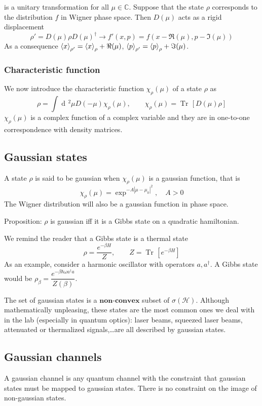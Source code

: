 \documentclass[a4paper, 11pt]{article}
\newcommand{\dd}{\mathop{\mathrm{d}\!}{}}
\newcommand{\Tr}{\mathop{\mathrm{Tr}\!}{}}
\newcommand{\HH}{\mathcal{H}}
\begin{document}
	is a unitary transformation for all $\mu \in \mathbb{C}$. Suppose that the state $\rho$ corresponds to the distribution $f$ in Wigner phase space. Then $D(\mu)$ acts as a rigid displacement
	\[ \rho' = D(\mu) \rho D(\mu)^\dagger \rightarrow f'(x,p) = f(x-\Re(\mu), p-\Im(\mu)) \]
	As a consequence $\braket{x}_{\rho'} = \braket{x}_\rho + \Re(\mu)$, $\braket{p}_{\rho'} = \braket{p}_\rho + \Im(\mu)$.
	
	\subsubsection{Characteristic function} We now introduce the characteristic function $\chi_\rho(\mu)$ of a state $\rho$ as
	\[ \rho = \int \dd^2\mu D(-\mu) \chi_\rho(\mu),\qquad \chi_\rho(\mu) = \Tr\left[D(\mu)\rho\right] \]
	$\chi_\rho(\mu)$ is a complex function of a complex variable and they are in one-to-one correspondence with density matrices.
	
	\subsection{Gaussian states} A state $\rho$ is said to be gaussian when $\chi_\rho(\mu)$ is a gaussian function, that is
	\[ \chi_\rho(\mu) = \exp^{-A|\mu-\mu_0|^2},\quad A> 0 \]
	The Wigner distribution will also be a gaussian function in phase space.
	
	Proposition: $\rho$ is gaussian iff it is a Gibbs state on a quadratic hamiltonian.
	
	\noindent We remind the reader that a Gibbs state is a thermal state
	\[ \rho = \dfrac{e^{-\beta H}}{Z},\qquad Z = \Tr\left[ e^{-\beta H} \right] \]
	As an example, consider a harmonic oscillator with operators $a,a^\dagger$. A Gibbs state would be $\rho_\beta = \dfrac{e^{-\beta\hbar\omega a^\dagger a}}{Z(\beta)}$.
	
	The set of gaussian states is a $\mathbf{non}$-$\mathbf{convex}$ subset of $\sigma(\HH)$. Although mathematically unpleasing, these states are the most common ones we deal with in the lab (especially in quantum optics): laser beams, squeezed laser beams, attenuated or thermalized signals,\dots are all described by gaussian states.
	
	\subsection{Gaussian channels}
	A gaussian channel is any quantum channel with the constraint that gaussian states must be mapped to gaussian states. There is no constraint on the image of non-gaussian states.
	
\end{document}
